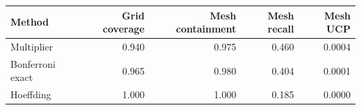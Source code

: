 \begin{tabular}{lrrrr}
\toprule
Method & Grid coverage & Mesh containment & Mesh recall & Mesh UCP \\
\midrule
Multiplier & 0.940 & 0.975 & 0.460 & 0.0004 \\
Bonferroni exact & 0.965 & 0.980 & 0.404 & 0.0001 \\
Hoeffding & 1.000 & 1.000 & 0.185 & 0.0000 \\
\bottomrule
\end{tabular}
